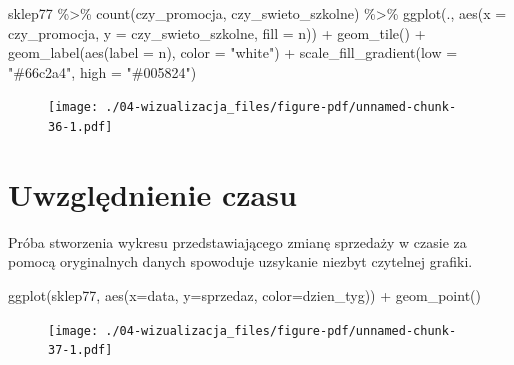 \documentclass[
  letterpaper,
  DIV=11,
  numbers=noendperiod]{scrreprt}
\newenvironment{Shaded}{\begin{snugshade}}{\end{snugshade}}
\newcommand{\AttributeTok}[1]{\textcolor[rgb]{0.40,0.45,0.13}{#1}}
\newcommand{\FunctionTok}[1]{\textcolor[rgb]{0.28,0.35,0.67}{#1}}
\newcommand{\NormalTok}[1]{\textcolor[rgb]{0.00,0.23,0.31}{#1}}
\newcommand{\SpecialCharTok}[1]{\textcolor[rgb]{0.37,0.37,0.37}{#1}}
\newcommand{\StringTok}[1]{\textcolor[rgb]{0.13,0.47,0.30}{#1}}
\begin{document}
\begin{Shaded}
\begin{Highlighting}[]
\NormalTok{sklep77 }\SpecialCharTok{\%\textgreater{}\%}
  \FunctionTok{count}\NormalTok{(czy\_promocja, czy\_swieto\_szkolne) }\SpecialCharTok{\%\textgreater{}\%}
  \FunctionTok{ggplot}\NormalTok{(., }\FunctionTok{aes}\NormalTok{(}\AttributeTok{x =}\NormalTok{ czy\_promocja, }
                \AttributeTok{y =}\NormalTok{ czy\_swieto\_szkolne,}
                \AttributeTok{fill =}\NormalTok{ n)) }\SpecialCharTok{+}
  \FunctionTok{geom\_tile}\NormalTok{() }\SpecialCharTok{+}
  \FunctionTok{geom\_label}\NormalTok{(}\FunctionTok{aes}\NormalTok{(}\AttributeTok{label =}\NormalTok{ n), }\AttributeTok{color =} \StringTok{"white"}\NormalTok{) }\SpecialCharTok{+}
  \FunctionTok{scale\_fill\_gradient}\NormalTok{(}\AttributeTok{low =} \StringTok{"\#66c2a4"}\NormalTok{, }
                      \AttributeTok{high =} \StringTok{"\#005824"}\NormalTok{)}
\end{Highlighting}
\end{Shaded}

\begin{figure}[H]

{\centering \texttt{[image: ./04-wizualizacja\_files/figure-pdf/unnamed-chunk-36-1.pdf]}

}

\end{figure}

\hypertarget{uwzglux119dnienie-czasu}{%
\section{Uwzględnienie czasu}\label{uwzglux119dnienie-czasu}}

Próba stworzenia wykresu przedstawiającego zmianę sprzedaży w czasie za
pomocą oryginalnych danych spowoduje uzsykanie niezbyt czytelnej
grafiki.

\begin{Shaded}
\begin{Highlighting}[]
\FunctionTok{ggplot}\NormalTok{(sklep77, }\FunctionTok{aes}\NormalTok{(}\AttributeTok{x=}\NormalTok{data,}
                    \AttributeTok{y=}\NormalTok{sprzedaz,}
                    \AttributeTok{color=}\NormalTok{dzien\_tyg)) }\SpecialCharTok{+}
  \FunctionTok{geom\_point}\NormalTok{()}
\end{Highlighting}
\end{Shaded}

\begin{figure}[H]

{\centering \texttt{[image: ./04-wizualizacja\_files/figure-pdf/unnamed-chunk-37-1.pdf]}

}

\end{figure}
\end{document}
